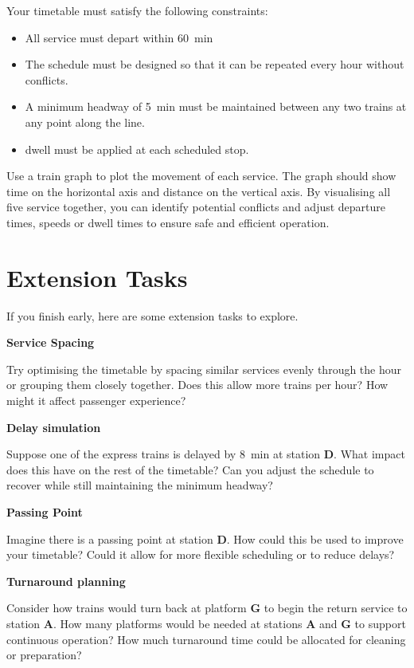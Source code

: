 \documentclass[a4paper]{article}
\begin{document}
	Your timetable must satisfy the following constraints:
	\begin{itemize}
		\item All service must depart within \qty{60}{\minute}
		\item The schedule must be designed so that it can be repeated every hour without conflicts.
		\item A minimum \gls{headway} of \qty{5}{\minute} must be maintained between any two trains at any point along the line.
		\item \gls{dwell} must be applied at each scheduled stop.
	\end{itemize}
	
	Use a train graph to plot the movement of each service. The graph should show time on the horizontal axis and distance on the vertical axis. By visualising all five service together, you can identify potential conflicts and adjust departure times, speeds or dwell times to ensure safe and efficient operation.
	
	\section{Extension Tasks}
	If you finish early, here are some extension tasks to explore.
	
	\textbf{Service Spacing}
	
	Try optimising the timetable by spacing similar services evenly through the hour or grouping them closely together. Does this allow more trains per hour? How might it affect passenger experience?
	
	\textbf{Delay simulation} 
	
	Suppose one of the express trains is delayed by \qty{8}{\minute} at station \textbf{D}. What impact does this have on the rest of the timetable? Can you adjust the schedule to recover while still maintaining the minimum headway?
	
	\textbf{Passing Point}
	
	Imagine there is a passing point at station \textbf{D}. How could this be used to improve your timetable? Could it allow for more flexible scheduling or to reduce delays?
	
	\textbf{Turnaround planning}
	
	Consider how trains would turn back at platform \textbf{G} to begin the return service to station \textbf{A}. How many platforms would be needed at stations \textbf{A} and \textbf{G} to support continuous operation? How much turnaround time could be allocated for cleaning or preparation?
	
	\printnoidxglossaries
	
\end{document}

